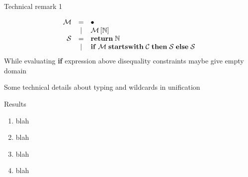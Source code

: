 \documentclass[aspectratio=169
  , xcolor={svgnames}
  , hyperref=
      { colorlinks
      , urlcolor=DarkBlue
      }
  , russian  %
  ]{beamer}
\begin{document}
\begin{frame}{Technical remark 1}

\[
\begin{array}{rcl}
  \mathcal M & =        & \bullet \\
  &    \mid  & \mathcal M\,[\mathbb{N}] \\
  \mathcal{S}        & =        & \mathbf{return}\;\mathbb{N} \\
  &    \mid  & \mathbf{if}\;\mathcal{M}\;\mathbf{starts with}\;\mathcal{C}\;\mathbf{then}\; \mathcal{S}\;\mathbf{else}\;\mathcal{S}
\end{array}
\]
While evaluating \textbf{if} expression above disequality constraints maybe give empty domain
\end{frame}

\begin{frame}{}
Some technical details about typing and wildcards in unification
\end{frame}



\begin{frame}{Results}

\begin{enumerate}
\item blah
\item blah
\item blah
\item blah

\end{enumerate}
\end{frame}

\begin{comment}


\begin{frame}[allowframebreaks]
\frametitle<presentation>{Ссылки}
\begin{thebibliography}{10}
  \bibitem{blow}
    Предотвращая коллапс цивилизации (Preventing the Collapse of Civilization), 2019 (in English)
    \newblock {\em Jonathan Blow}
    \newblock\href{https://youtu.be/pW-SOdj4Kkk}{YouTube}
  \bibitem{cheatsheets}
    Шпаргалки по синтаксису OCaml
    \newblock {\em OCamlPro}
    \newblock\href{https://ocaml.org/docs/cheat_sheets.html}{4 PDF online}
  \bibitem{rwo}
    Книга Real World OCaml издания 2.0 (есть русский перевод издания 1.0)
    \newblock\href{https://dev.realworldocaml.org/toc.html}{online}
  \bibitem{javaTuringComplete}
    Java Generics are Turing Complete
    \newblock {\em Radu Grigore}
    \newblock\href{https://arxiv.org/pdf/1605.05274}{online}
  \bibitem{algDThistory}
    A Brief History of Algebraic Data Types
    \newblock {\em Li-yao Xia}
    \newblock\href{https://docs.google.com/presentation/d/131_CYsd9mEL-0XqXMyV7JeahWgtNCUV_JwjH7WqYFcI/edit}{online}
\end{thebibliography}
\end{frame}
\end{comment}
\end{document}
